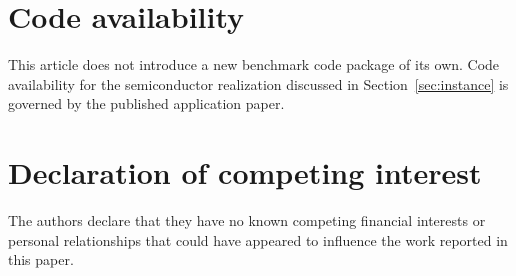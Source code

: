 \documentclass[preprint,12pt]{elsarticle}
\theoremstyle{definition}
\numberwithin{equation}{section}
\begin{document}
\section*{Code availability}

This article does not introduce a new benchmark code package of its own. Code availability for the semiconductor realization discussed in Section~\ref{sec:instance} is governed by the published application paper.

\section*{Declaration of competing interest}

The authors declare that they have no known competing financial interests or personal relationships that could have appeared to influence the work reported in this paper.
\end{document}
